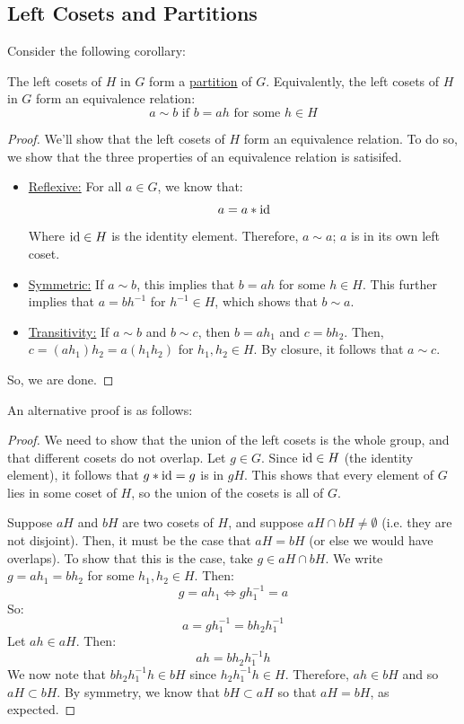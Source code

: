 \documentclass[letterpaper]{article}
\begin{document}
\subsection{Left Cosets and Partitions}
Consider the following corollary: 
\begin{corollary}{}{}
    The left cosets of $H$ in $G$ form a \underline{partition} of $G$. Equivalently, the left cosets of $H$ in $G$ form an equivalence relation: 
    \[a \sim b \text{ if } b = ah \text{ for some } h \in H\]
\end{corollary}
\begin{mdframed}
    \begin{proof}
        We'll show that the left cosets of $H$ form an equivalence relation. To do so, we show that the three properties of an equivalence relation is satisifed.  
        \begin{itemize}
            \item \underline{Reflexive:} For all $a \in G$, we know that: 
            \[a = a * \operatorname{id}\]
            Where $\operatorname{id} \in H$ is the identity element. Therefore, $a \sim a$; $a$ is in its own left coset. 
            
            \item \underline{Symmetric:} If $a \sim b$, this implies that $b = ah$ for some $h \in H$. This further implies that $a = bh^{-1}$ for $h^{-1} \in H$, which shows that $b \sim a$. 
            
            \item \underline{Transitivity:} If $a \sim b$ and $b \sim c$, then $b = ah_1$ and $c = bh_2$. Then, $c = (ah_1)h_2 = a(h_1 h_2)$ for $h_1, h_2 \in H$. By closure, it follows that $a \sim c$. 
        \end{itemize}
        So, we are done. 
    \end{proof}
\end{mdframed}

An alternative proof is as follows: 
\begin{mdframed}
    \begin{proof}
        We need to show that the union of the left cosets is the whole group, and that different cosets do not overlap. Let $g \in G$. Since $\operatorname{id} \in H$ (the identity element), it follows that $g * \operatorname{id} = g$ is in $gH$. This shows that every element of $G$ lies in some coset of $H$, so the union of the cosets is all of $G$. 

        \bigskip 

        Suppose $aH$ and $bH$ are two cosets of $H$, and suppose $aH \cap bH \neq \emptyset$ (i.e. they are not disjoint). Then, it must be the case that $aH = bH$ (or else we would have overlaps). To show that this is the case, take $g \in aH \cap bH$. We write $g = ah_1 = bh_2$ for some $h_1, h_2 \in H$. Then: 
        \[g = ah_1 \iff gh_{1}^{-1} = a\]
        So: 
        \[a = gh_{1}^{-1} = bh_2 h_{1}^{-1}\]
        Let $ah \in aH$. Then: 
        \[ah = bh_2 h_{1}^{-1}h\]
        We now note that $bh_2 h_{1}^{-1}h \in bH$ since $h_2 h_{1}^{-1}h \in H$. Therefore, $ah \in bH$ and so $aH \subset bH$. By symmetry, we know that $bH \subset aH$ so that $aH = bH$, as expected. 
    \end{proof}
\end{mdframed}
\end{document}
